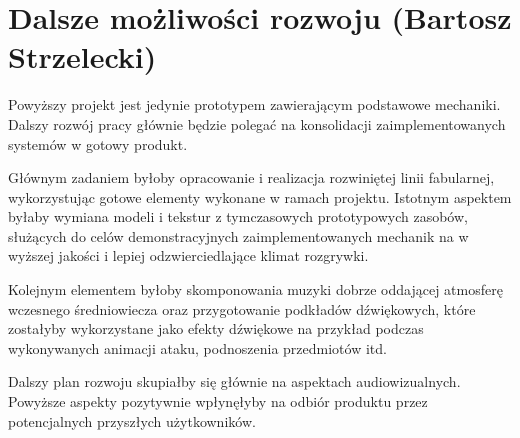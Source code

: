 \section{Dalsze możliwości rozwoju (Bartosz Strzelecki)}
Powyższy projekt jest jedynie prototypem zawierającym podstawowe mechaniki.
Dalszy rozwój pracy głównie będzie polegać na konsolidacji zaimplementowanych
systemów w gotowy produkt.

Głównym zadaniem byłoby opracowanie i realizacja rozwiniętej linii fabularnej,
wykorzystując gotowe elementy wykonane w ramach projektu. Istotnym aspektem
byłaby wymiana  modeli i tekstur z tymczasowych prototypowych zasobów, służących
do celów demonstracyjnych zaimplementowanych mechanik na w wyższej jakości
i lepiej odzwierciedlające klimat rozgrywki.

Kolejnym elementem byłoby skomponowania muzyki dobrze oddającej atmosferę wczesnego
średniowiecza oraz przygotowanie podkładów dźwiękowych, które zostałyby wykorzystane
jako efekty dźwiękowe na przykład podczas wykonywanych animacji ataku, podnoszenia przedmiotów itd.

Dalszy plan rozwoju skupiałby się głównie na aspektach audiowizualnych.
Powyższe aspekty pozytywnie wpłynęłyby na odbiór produktu przez potencjalnych przyszłych
użytkowników. 
